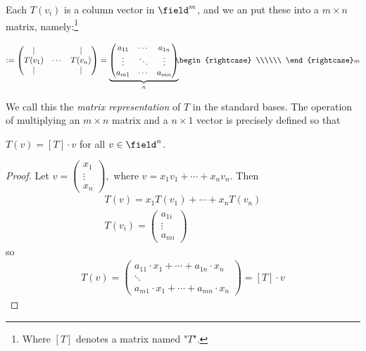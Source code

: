 Each $T(v_i)$ is a column vector in $\field^m$, and we an put these into a $m \times n$ matrix, namely:\footnote{Where $[T]$ denotes a matrix named "$T$".}

\begin{align*}
    [T] := \begin{pmatrix}
        \vert & & \vert \\
        T(v_1) & \cdots & T(v_n) \\
        \vert & & \vert 
    \end{pmatrix} = \underbrace{\begin{pmatrix}
        a_{11} & \cdots & a_{1n}\\
        \vdots & \ddots & \vdots\\
        a_{m1} & \cdots & a_{mn}
    \end{pmatrix}}_{n}
    \hspace{-0.6em}
    \begin{rightcase}
        \\\\\\
    \end{rightcase}\text{\scriptsize{$m$}}
\end{align*}

We call this the \emph{matrix representation} of $T$ in the standard bases. The operation of multiplying an $m \times n$ matrix and a $n \times 1$ vector is precisely defined so that \begin{proposition}\label{prop:tofvequalmatt}
    $T(v) = [T] \cdot v$ for all $v \in \field^n$.
\end{proposition}

\begin{proof}
    Let $v = \begin{pmatrix}
        x_1\\
        \vdots\\
        x_n
    \end{pmatrix},$ where $v = x_1 v_1 + \cdots + x_n v_n$. Then \begin{align*}
        T(v) = x_1 T(v_1) + \cdots + x_n T(v_n)\\
        T(v_i) = \begin{pmatrix}
            a_{1i}\\
            \vdots\\
            a_{mi}
        \end{pmatrix}
    \end{align*}
    so
    \begin{align*}
        T(v) = \begin{pmatrix}
            a_{11} \cdot x_1 + \cdots + a_{1n} \cdot x_n\\
            \ddots \\
            a_{m1} \cdot x_1 + \cdots + a_{mn} \cdot x_n
        \end{pmatrix} = [T]\cdot v  
    \end{align*}
\end{proof}

